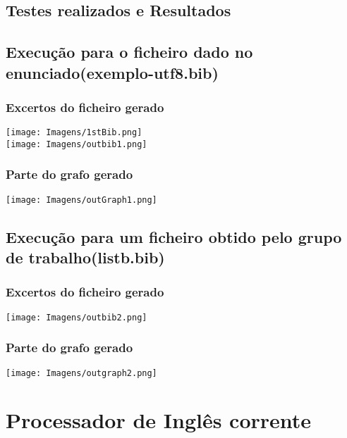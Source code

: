 \documentclass{report}
\begin{document}
\subsection{Testes realizados e Resultados}

\subsection{Execução para o ficheiro dado no enunciado(exemplo-utf8.bib)}

\subsubsection{Excertos do ficheiro gerado}

\texttt{[image: Imagens/1stBib.png]} \\
\texttt{[image: Imagens/outbib1.png]} \\

\subsubsection{Parte do grafo gerado}

\texttt{[image: Imagens/outGraph1.png]} \\

\subsection{Execução para um ficheiro obtido pelo grupo de trabalho(listb.bib)}

\subsubsection{Excertos do ficheiro gerado}

\texttt{[image: Imagens/outbib2.png]} \\

\subsubsection{Parte do grafo gerado}

\texttt{[image: Imagens/outgraph2.png]}


\section{Processador de Inglês corrente}
\end{document}
